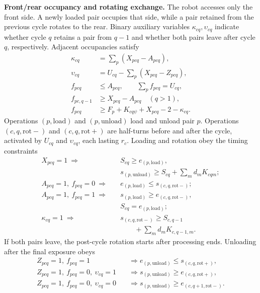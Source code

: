 \documentclass[final,5p,times,twocolumn]{elsarticle}
\begin{document}
\noindent\textbf{Front/rear occupancy and rotating exchange.}
The robot accesses only the front side. A newly loaded pair occupies that side, while a pair retained from the previous cycle rotates to the rear. Binary auxiliary variables $\kappa_{cq},\upsilon_{cq}$ indicate whether cycle $q$ retains a pair from $q-1$ and whether both pairs leave after cycle $q$, respectively. Adjacent occupancies satisfy
\begin{equation}
\begin{aligned}
\kappa_{cq}&=\sum_p(X_{pcq}-A_{pcq}),\\
\upsilon_{cq}&=U_{cq}-\sum_p(X_{pcq}-Z_{pcq}),\\
f_{pcq}&\le A_{pcq},\qquad\sum_pf_{pcq}=U_{cq},\\
f_{pc,q-1}&\ge X_{pcq}-A_{pcq}\quad(q>1),\\
f_{pcq}&\ge F_p+K_{cq\psi}+X_{pcq}-2-\kappa_{cq}.
\end{aligned}
\label{eq:cycle-side-cn}
\end{equation}
Operations $(p,\mathrm{load})$ and $(p,\mathrm{unload})$ load and unload pair $p$. Operations $(c,q,\mathrm{rot-})$ and $(c,q,\mathrm{rot+})$ are half-turns before and after the cycle, activated by $U_{cq}$ and $\upsilon_{cq}$, each lasting $r_c$. Loading and rotation obey the timing constraints
\begin{equation}
\begin{aligned}
X_{pcq}=1\ \Rightarrow\quad
&S_{cq}\ge e_{(p,\mathrm{load})},\\
&s_{(p,\mathrm{unload})}\ge S_{cq}+\sum_m d_mK_{cqm};\\
A_{pcq}=1,\ f_{pcq}=0\ \Rightarrow\quad
&e_{(p,\mathrm{load})}\le s_{(c,q,\mathrm{rot-})};\\
A_{pcq}=1,\ f_{pcq}=1\ \Rightarrow\quad
&s_{(p,\mathrm{load})}\ge e_{(c,q,\mathrm{rot-})},\\
&S_{cq}=e_{(p,\mathrm{load})};\\
\kappa_{cq}=1\ \Rightarrow\quad
&s_{(c,q,\mathrm{rot-})}\ge S_{c,q-1}\\
&\qquad+\sum_m d_mK_{c,q-1,m}.
\end{aligned}
\label{eq:cycle-load-cn}
\end{equation}
If both pairs leave, the post-cycle rotation starts after processing ends. Unloading after the final exposure obeys
\begin{equation}
\begin{aligned}
Z_{pcq}=1,\ f_{pcq}=1\quad
&\Rightarrow e_{(p,\mathrm{unload})}\le s_{(c,q,\mathrm{rot+})},\\
Z_{pcq}=1,\ f_{pcq}=0,\ \upsilon_{cq}=1\quad
&\Rightarrow s_{(p,\mathrm{unload})}\ge e_{(c,q,\mathrm{rot+})},\\
Z_{pcq}=1,\ f_{pcq}=0,\ \upsilon_{cq}=0\quad
&\Rightarrow s_{(p,\mathrm{unload})}\ge e_{(c,q+1,\mathrm{rot-})}.
\end{aligned}
\label{eq:cycle-unload-cn}
\end{equation}
\end{document}
